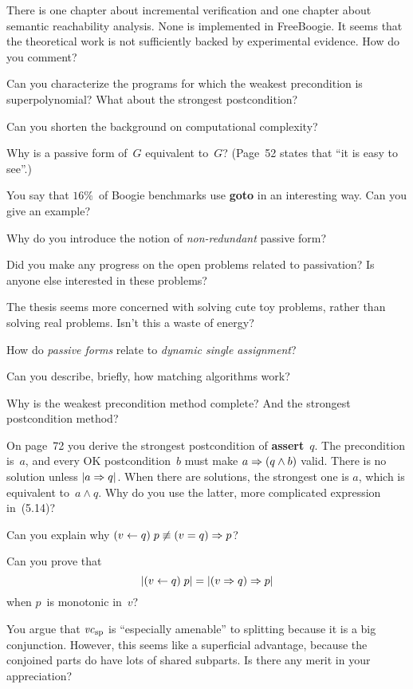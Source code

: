 \Q There is one chapter about incremental verification and one chapter
about semantic reachability analysis. None is implemented in FreeBoogie. It
seems that the theoretical work is not sufficiently backed by experimental
evidence.  How do you comment?

\Q Can you characterize the programs for which the weakest precondition is
superpolynomial? What about the strongest postcondition?

\Q Can you shorten the background on computational complexity?


\Q Why is a passive form of~$G$ equivalent to~$G$? (Page~52 states that ``it
is easy to see''.)

\Q You say that $16\%$~of Boogie benchmarks use {\bf goto} in an
interesting way. Can you give an example?

\Q Why do you introduce the notion of {\it non-redundant\/} passive
form?


\Q Did you make any progress on the open problems related to passivation?
Is anyone else interested in these problems?

\Q The thesis seems more concerned with solving cute toy problems, rather
than solving real problems. Isn't this a waste of energy?

\Q How do {\it passive forms\/} relate to {\it dynamic single assignment\/}?

\Q Can you describe, briefly, how matching algorithms work?

\Q Why is the weakest precondition method complete? And the strongest
postcondition method?

\Q On page~72 you derive the strongest postcondition of {\bf assert}~$q$.
The precondition is~$a$, and every OK postcondition~$b$ must make $a\Rightarrow
(q\land b)$ valid. There is no solution unless $|a\Rightarrow q|$.  When there
are solutions, the strongest one is $a$, which is equivalent to~$a\land q$.
Why do you use the latter, more complicated expression in~(5.14)?


\Q Can you explain why $(v\gets q)\;p\not\equiv(v=q)\Rightarrow p$?

\Q Can you prove that $$|(v\gets q)\;p|=|(v\Rightarrow q)\Rightarrow p|$$ when $p$~is
monotonic in~$v$?

\Q You argue that ${\it vc}_{\rm sp}$ is ``especially amenable'' to
splitting because it is a big conjunction. However, this seems like a
superficial advantage, because the conjoined parts do have lots of shared
subparts.  Is there any merit in your appreciation?

